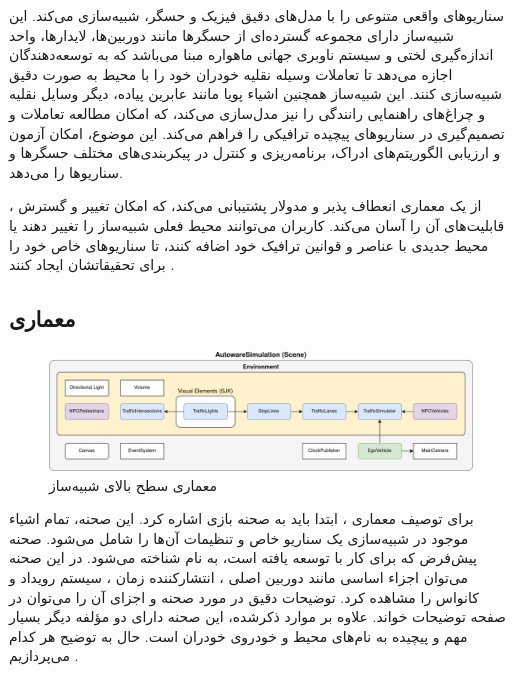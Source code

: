  سناریوهای واقعی متنوعی را با مدل‌های دقیق فیزیک و حسگر، شبیه‌سازی می‌کند. این شبیه‌ساز دارای مجموعه‌ گسترده‌ای از حسگرها مانند دوربین‌ها، لایدارها،‌ واحد اندازه‌گیری لختی و سیستم ناوبری جهانی ماهواره مبنا می‌باشد که به توسعه‌دهندگان اجازه می‌دهد تا تعاملات وسیله نقلیه خودران خود را با محیط به صورت دقیق شبیه‌سازی کنند. این شبیه‌ساز همچنین اشیاء پویا مانند عابرین پیاده، دیگر وسایل نقلیه و چراغ‌های راهنمایی رانندگی را نیز مدل‌سازی می‌کند، که امکان مطالعه تعاملات و تصمیم‌گیری در سناریوهای پیچیده ترافیکی را فراهم می‌کند. این موضوع، امکان آزمون و ارزیابی الگوریتم‌های ادراک، برنامه‌ریزی و کنترل در پیکربندی‌های مختلف حسگرها و سناریوها را می‌دهد.

، از یک معماری انعطاف پذیر و مدولار پشتیبانی می‌کند، که امکان تغییر و گسترش قابلیت‌های آن را آسان می‌کند. کاربران می‌توانند محیط فعلی شبیه‌ساز را تغییر دهند یا محیط جدیدی با عناصر و قوانین ترافیک خود اضافه کنند، تا سناریوهای خاص خود را برای تحقیقاتشان ایجاد کنند \cite{AWSIM:Documentation}. 

\subsection{معماری}

\begin{figure}[h!]
    \centering
    \includegraphics[width=1\linewidth]{figures/AWSIM_Architecture.png}
    \caption{معماری سطح بالای شبیه‌ساز  \cite{AWSIM:Documentation}}
    \label{fig:AWSIM_Architecture}
\end{figure}

برای توصیف معماری ، ابتدا باید به صحنه بازی اشاره کرد. این صحنه، تمام اشیاء موجود در شبیه‌سازی یک سناریو خاص و تنظیمات آن‌ها را شامل می‌شود. صحنه پیش‌فرض  که برای کار با  توسعه یافته است، به نام  شناخته می‌شود.
در این صحنه می‌توان اجزاء اساسی مانند دوربین اصلی ، انتشارکننده زمان ، سیستم رویداد  و کانواس  را مشاهده کرد. توضیحات دقیق در مورد صحنه و اجزای آن را می‌توان در صفحه توضیحات  خواند.
علاوه بر موارد ذکرشده، این صحنه دارای دو مؤلفه دیگر بسیار مهم و پیچیده به نام‌های محیط  و خودروی خودران  است. حال به توضیح هر کدام می‌پردازیم \cite{Autoware:Documentation}.

